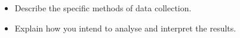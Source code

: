 \begin{itemize}
    \item Describe the specific methods of data collection.
    \item Explain how you intend to analyse and interpret the results.
\end{itemize}
